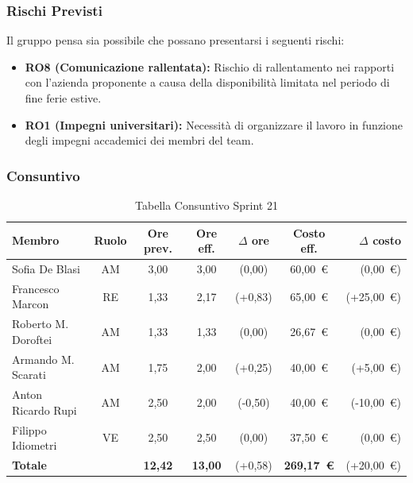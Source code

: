 \subsubsection{Rischi Previsti}
Il gruppo pensa sia possibile che possano presentarsi i seguenti rischi:
\begin{itemize}
    \item \textbf{RO8 (Comunicazione rallentata):} Rischio di rallentamento nei rapporti con l'azienda proponente a causa della disponibilità limitata nel periodo di fine ferie estive.
    \item \textbf{RO1 (Impegni universitari):} Necessità di organizzare il lavoro in funzione degli impegni accademici dei membri del team.
\end{itemize}

\subsubsection{Consuntivo}
\begin{table}[H]
    \centering
    \renewcommand{\arraystretch}{1.3}
    \begin{tabularx}{\textwidth}{|X|c|c|c|c|c|r|}
        \hline
        \textbf{Membro} & \textbf{Ruolo} & \textbf{Ore prev.} &
        \textbf{Ore eff.} & \textbf{$\Delta$ ore} &
        \textbf{Costo eff.} & \textbf{$\Delta$ costo} \\
        \hline
        Sofia De Blasi       & AM & 3,00 & 3,00 & {\color{green}(0,00)}  & 60{,}00~\euro & {\color{green}(0{,}00~\euro)} \\
        Francesco Marcon     & RE & 1,33 & 2,17 & {\color{red}(+0,83)}   & 65{,}00~\euro & {\color{red}(+25{,}00~\euro)} \\
        Roberto M. Doroftei  & AM & 1,33 & 1,33 & {\color{green}(0,00)}  & 26{,}67~\euro & {\color{green}(0{,}00~\euro)} \\
        Armando M. Scarati   & AM & 1,75 & 2,00 & {\color{red}(+0,25)}   & 40{,}00~\euro & {\color{red}(+5{,}00~\euro)} \\
        Anton Ricardo Rupi   & AM & 2,50 & 2,00 & {\color{green}(-0,50)} & 40{,}00~\euro & {\color{green}(-10{,}00~\euro)} \\
        Filippo Idiometri    & VE & 2,50 & 2,50 & {\color{green}(0,00)}  & 37{,}50~\euro & {\color{green}(0{,}00~\euro)} \\
        \hline
        \textbf{Totale} & & \textbf{12,42} & \textbf{13,00} & {\color{red}(+0,58)} & \textbf{269{,}17~\euro} & {\color{red}(+20{,}00~\euro)} \\
        \hline
    \end{tabularx}
    \caption{Tabella Consuntivo Sprint 21}
\end{table}

